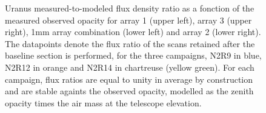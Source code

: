 \begin{figure}[ht!]
\begin{center}
\caption[Uranus flux density stability against observed
  opacity]{Uranus measured-to-modeled flux density ratio as a fonction
  of the measured observed opacity for array 1 (upper left), array 3
  (upper right), 1mm array combination (lower left) and array 2 (lower
  right). The datapoints denote the flux ratio of the scans retained after the
  baseline section is performed, for the three campaigns, N2R9
  in blue, N2R12 in orange and N2R14 in chartreuse (yellow green). For
  each campaign, flux ratios are equal to unity in average by
  construction and are stable againts the observed opacity, modelled as
  the zenith opacity times the air mass at the telescope elevation.}
\label{fig:uranus_flux_obstau}
\end{center}
\end{figure}
